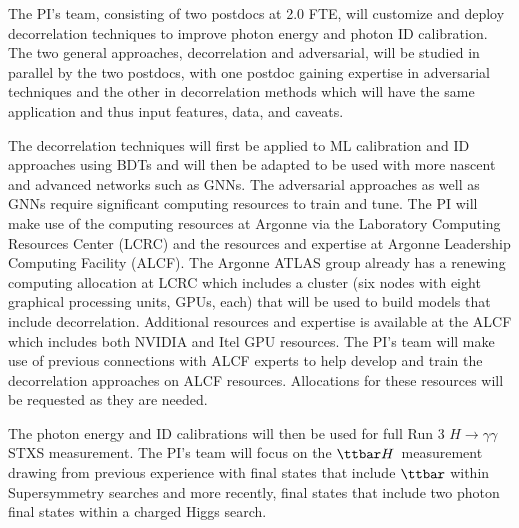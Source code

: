 \documentclass[letter, USenglish, 11pt, subfigure]{article}
\newcommand{\tth}{\ensuremath{\ttbar H}}
\begin{document}





The PI's team, consisting of two postdocs at 2.0 FTE, will customize and deploy decorrelation techniques to improve photon energy and photon ID calibration. The two general approaches, decorrelation and adversarial, will be studied in parallel by the two postdocs, with one postdoc gaining expertise in adversarial techniques and the other in decorrelation methods which will have the same application and thus input features, data, and caveats.

The decorrelation techniques will first be applied to ML calibration and ID approaches using BDTs and will then be adapted to be used with more nascent and advanced networks such as GNNs. The adversarial approaches as well as GNNs require significant computing resources to train and tune. The PI will make use of the computing resources at Argonne via the Laboratory Computing Resources Center (LCRC) and the resources and expertise at Argonne Leadership Computing Facility (ALCF). The Argonne ATLAS group already has a renewing computing allocation at LCRC which includes a cluster (six nodes with eight graphical processing units, GPUs, each) that will be used to build models that include decorrelation. Additional resources and expertise is available at the ALCF which includes both NVIDIA and Itel GPU resources. The PI's team will make use of previous connections with ALCF experts to help develop and train the decorrelation approaches on ALCF resources. Allocations for these resources will be requested as they are needed.

The photon energy and ID calibrations will then be used for full Run 3 $H\to\gamma\gamma$ STXS measurement. The PI's team will focus on the \tth\ measurement drawing from previous experience with final states that include $\ttbar$ within Supersymmetry searches and more recently, final states that include two photon final states within a charged Higgs search. 
\end{document}
